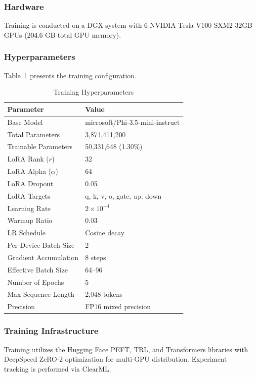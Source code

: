 \documentclass[conference]{IEEEtran}
\begin{document}
\subsubsection{Hardware}
Training is conducted on a DGX system with 6 NVIDIA Tesla V100-SXM2-32GB GPUs (204.6 GB total GPU memory).

\subsubsection{Hyperparameters}
Table~\ref{tab:hyperparams} presents the training configuration.

\begin{table}[t]
\caption{Training Hyperparameters}
\label{tab:hyperparams}
\centering
\begin{tabular}{ll}
\hline
\textbf{Parameter} & \textbf{Value} \\
\hline
Base Model & microsoft/Phi-3.5-mini-instruct \\
Total Parameters & 3,871,411,200 \\
Trainable Parameters & 50,331,648 (1.30\%) \\
LoRA Rank ($r$) & 32 \\
LoRA Alpha ($\alpha$) & 64 \\
LoRA Dropout & 0.05 \\
LoRA Targets & q, k, v, o, gate, up, down \\
Learning Rate & $2 \times 10^{-4}$ \\
Warmup Ratio & 0.03 \\
LR Schedule & Cosine decay \\
Per-Device Batch Size & 2 \\
Gradient Accumulation & 8 steps \\
Effective Batch Size & 64--96 \\
Number of Epochs & 5 \\
Max Sequence Length & 2,048 tokens \\
Precision & FP16 mixed precision \\
\hline
\end{tabular}
\end{table}

\subsubsection{Training Infrastructure}
Training utilizes the Hugging Face PEFT, TRL, and Transformers libraries with DeepSpeed ZeRO-2 optimization for multi-GPU distribution. Experiment tracking is performed via ClearML.
\end{document}
